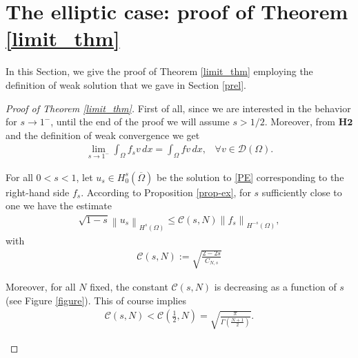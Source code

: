 \documentclass[reqno,twoside]{amsart}
\numberwithin{equation}{section}
\newcommand{\norm}[2]{{\left\|#1\right\|}_{#2}}
\newcommand{\cns}{C_{N,s}}
\begin{document}
\section{The elliptic case: proof of Theorem \ref{limit_thm}}\label{weak_sec}
In this Section, we give the proof of Theorem \ref{limit_thm} employing the definition of weak solution that we gave in Section \ref{prel}. 

\begin{proof}[Proof of Theorem \ref{limit_thm}]
First of all, since we are interested in the behavior for $s\to 1^-$, until the end of the proof we will assume $s> 1/2$.  
Moreover, from $\textbf{H2}$ and the definition of weak convergence we get 
\begin{align}\label{limit-rhs}
	\lim_{s\to 1^-}\int_{\Omega} f_sv\,dx = \int_{\Omega} fv\,dx, \;\;\; \forall v\in\mathcal{D}(\Omega).
\end{align}

For all $0<s<1$, let $u_s\in H_0^s(\overline{\Omega})$ be the solution to \eqref{PE} corresponding to the right-hand side $f_s$. According to Proposition \ref{prop-ex}, for $s$ sufficiently close to one we have the estimate
\begin{align}\label{norm_est}
	\sqrt{1-s}\norm{u_s}{H^s(\Omega)}\leq\mathcal{C}(s,N)\norm{f_s}{H^{-s}(\Omega)},
\end{align}
with 
\begin{align*}
	\mathcal{C}(s,N) := \sqrt{\frac{2-2s}{\cns}}
\end{align*}

Moreover, for all $N$ fixed, the constant $\mathcal{C}(s,N)$ is decreasing as a function of $s$ (see Figure \ref{figure}). This of course implies
\begin{align*}
	\mathcal{C}(s,N) < \mathcal{C}\left(\frac 12,N\right) = \sqrt{\frac{\pi}{\Gamma\left(\frac{N+1}{2}\right)}}.
\end{align*}

\begin{figure}[h]
\centering
{}
%
\end{figure}
\end{proof}
\end{document}
